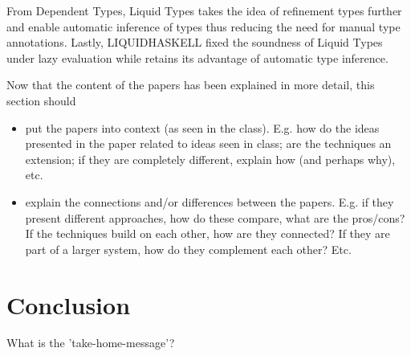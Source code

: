 \documentclass[a4paper,UKenglish]{lipics-v2016}
\begin{document}
  From Dependent Types, Liquid Types takes the idea of refinement types further
  and enable automatic inference of types thus reducing the need for manual
  type annotations.  Lastly, LIQUIDHASKELL fixed the soundness of Liquid Types
  under lazy evaluation while retains its advantage of automatic type
  inference.

  Now that the content of the papers has been explained in more detail,
  this section should
  \begin{itemize}
    \item put the papers into context (as seen in the class). E.g. how do the
    ideas presented in the paper related to ideas seen in class; are the techniques
    an extension; if they are completely different, explain how (and perhaps why), etc.

    \item explain the connections and/or differences between the papers.
      E.g. if they present different approaches, how do these compare, what are the pros/cons?
      If the techniques build on each other, how are they connected?
      If they are part of a larger system, how do they complement each other?
      Etc.

  \end{itemize}

\section{Conclusion}

  What is the 'take-home-message'?





\end{document}
